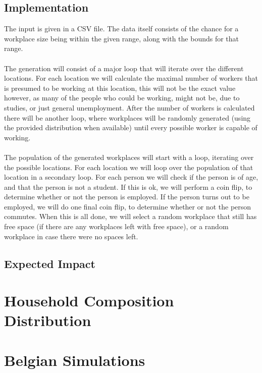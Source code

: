 \documentclass[runningheads]{llncs}
\begin{document}
	\subsection{Implementation}
	The input is given in a CSV file. The data itself consists of the chance for a workplace size being within the given range, along with the bounds for that range. \\
	\\
	The generation will consist of a major loop that will iterate over the different locations. For each location we will calculate the maximal number of workers that is presumed to be working at this location, this will not be the exact value however, as many of the people who could be working, might not be, due to studies, or just general unemployment. After the number of workers is calculated there will be another loop, where workplaces will be randomly generated (using the provided distribution when available) until every possible worker is capable of working. \\
	\\
	The population of the generated workplaces will start with a loop, iterating over the possible locations. For each location we will loop over the population of that location in a secondary loop. For each person we will check if the person is of age, and that the person is not a student. If this is ok, we will perform a coin flip, to determine whether or not the person is employed. If the person turns out to be employed, we will do one final coin flip, to determine whether or not the person commutes. When this is all done, we will select a random workplace that still has free space (if there are any workplaces left with free space), or a random workplace in case there were no spaces left. 
	\subsection{Expected Impact}
	
	\section{Household Composition Distribution}
	\section{Belgian Simulations}
	
\end{document}
